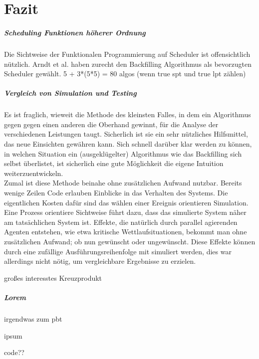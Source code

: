\chapter{Fazit}

\paragraph{Scheduling Funktionen höherer Ordnung}
Die Sichtweise der Funktionalen Programmierung auf Scheduler ist offensichtlich nützlich. Arndt et al. \cite{Arn99} haben zurecht den Backfilling Algorithmus als bevorzugten Scheduler gewählt.
5 + 3*(5*5) = 80 algos (wenn true spt und true lpt zählen)

\paragraph{Vergleich von Simulation und Testing}
Es ist fraglich, wieweit die Methode des kleinsten Falles, in dem ein Algorithmus gegen gegen einen anderen die Oberhand gewinnt, für die Analyse der verschiedenen Leistungen taugt. Sicherlich ist sie ein sehr nützliches Hilfsmittel, das neue Einsichten gewähren kann. Sich schnell darüber klar werden zu können, in welchen Situation ein (ausgeklügelter) Algorithmus wie das Backfilling sich selbst überlistet, ist sicherlich eine gute Möglichkeit die eigene Intuition weiterzuentwickeln.\\
Zumal ist diese Methode beinahe ohne zusätzlichen Aufwand nutzbar. Bereits wenige Zeilen Code erlauben Einblicke in das Verhalten des Systems. Die eigentlichen Kosten dafür sind das wählen einer Ereignis orientieren Simulation. Eine Prozess orientiere Sichtweise führt dazu, dass das simulierte System näher am tatsächlichen System ist. Effekte, die natürlich durch parallel agierenden Agenten entstehen, wie etwa kritische Wettlaufsituationen, bekommt man ohne zusätzlichen Aufwand; ob nun gewünscht oder ungewünscht. Diese Effekte können durch eine zufällige Ausführungsreihenfolge mit simuliert werden, dies war allerdings nicht nötig, um vergleichbare Ergebnisse zu erzielen.

großes interesstes Kreuzprodukt


\paragraph{Lorem}
irgendwas zum pbt

ipsum


code??